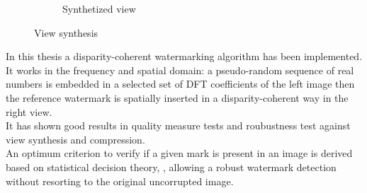 \begin{figure}[h!]
\begin{subfigure}[]{0.4\textwidth}
\caption{\small{Synthetized view}}
\label{fig:vs3}
\end{subfigure}
\caption{\small{View synthesis}\label{fig:vs}}
\end{figure}



In this thesis a disparity-coherent watermarking algorithm has been implemented. It works in the frequency and spatial domain: a pseudo-random sequence of real numbers is embedded in a selected set of DFT coefficients of the left image then the reference watermark is spatially inserted in a disparity-coherent way in the right view.\\
It has shown good results in quality measure tests and roubustness test against view synthesis and compression.\\
An optimum criterion to verify if a given mark is present in an image is derived based on statistical decision theory, \cite{STAT}, allowing a robust watermark detection without resorting to the original uncorrupted image.\\







